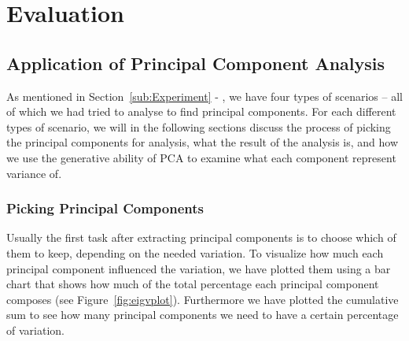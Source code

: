 \section{Evaluation}
\subsection{Application of Principal Component Analysis}
\label{sub:ApplicationofPrincipalComponentAnalysis}
As mentioned in Section~\ref{sub:Experiment} - , we have four types of scenarios --
all of which we had tried to analyse to find principal components.
For each different types of scenario, we will in the following sections discuss the process of picking the principal components for analysis, what the result of the analysis is, and
how we use the generative ability of PCA to examine what each component represent variance of.

\subsubsection{Picking Principal Components}
\label{ssub:PickingPrincipalComponents}
Usually the first task after extracting principal components is to choose which of them to keep, depending on the needed variation. 
To visualize how much each principal component influenced the variation, we have plotted them using a bar chart that shows how much
of the total percentage each principal component composes (see Figure~\ref{fig:eigvplot}).
Furthermore we have plotted the cumulative sum to see how many principal components we need to have a certain percentage of variation.\\

  \begin{minipage}{\linewidth}
  \centering
  \label{fig:eigvplot}
  \end{minipage}\\\\

